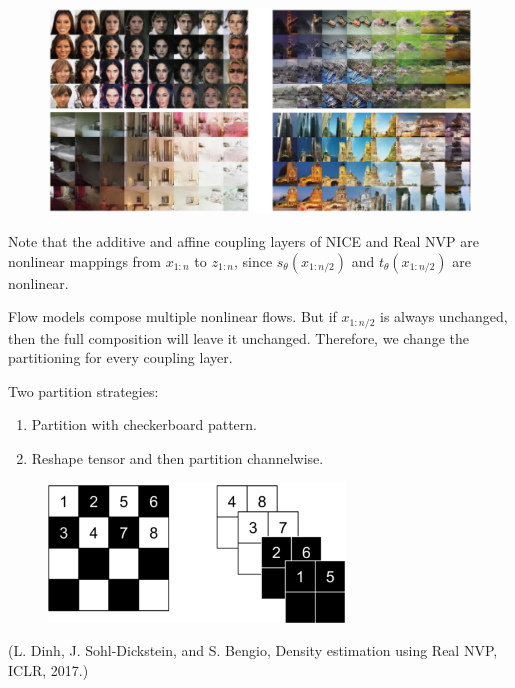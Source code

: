 \documentclass{report}
\begin{document}
\begin{figure}[H]
    \centering
    \includegraphics[width=1.0\textwidth]{.././assets/10.14.png}
\end{figure}

\par\noindent\textcolor{gray}{\hdashrule{\textwidth}{0.4pt}{1pt 2pt}}

\begin{concept}
    Note that the additive and affine coupling layers of NICE and Real NVP are nonlinear mappings from $x_{1: n}$ to $z_{1: n}$, since $s_{\theta}\left(x_{1: n / 2}\right)$ and $t_{\theta}\left(x_{1: n / 2}\right)$ are nonlinear.

    Flow models compose multiple nonlinear flows. But if $x_{1: n / 2}$ is always unchanged, then the full composition will leave it unchanged. Therefore, we change the partitioning for every coupling layer.
\end{concept}

\begin{concept}
    Two partition strategies:

    \begin{enumerate}
        \item Partition with checkerboard pattern.
        \item Reshape tensor and then partition channelwise.
    \end{enumerate}

    \begin{figure}[H]
        \centering
        \includegraphics[width=0.7\textwidth]{.././assets/10.15.png}
    \end{figure}

    (L. Dinh, J. Sohl-Dickstein, and S. Bengio, Density estimation using Real NVP, ICLR, 2017.)
\end{concept}
\end{document}
